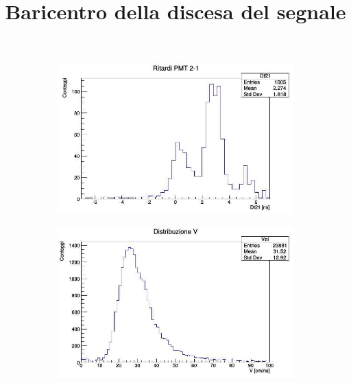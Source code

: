 \documentclass[a4paper,twocolumn]{article}
\begin{document}
\begin{figure}[H]
     \centering
     \title{Baricentro della discesa del segnale}
     \begin{center}
     \begin{subfigure}[b]{0.4\textwidth}
         \centering
         \includegraphics[width=\textwidth]{./immagini/TimeOfFlight/Rit21IntNegSlo.jpg}
         \caption{}
         \label{fig:Dt21IntNegSlo}
     \end{subfigure}
     \hfill
     \begin{subfigure}[b]{0.4\textwidth}
         \centering
         \includegraphics[width=\textwidth]{./immagini/TimeOfFlight/VIntNegSlo.jpg}
         \caption{}
         \label{fig:VIntNegSlo}
     \end{subfigure}
     \end{center}
     \caption{}        
     \label{fig:IntNegSlo}
\end{figure}
\end{document}
